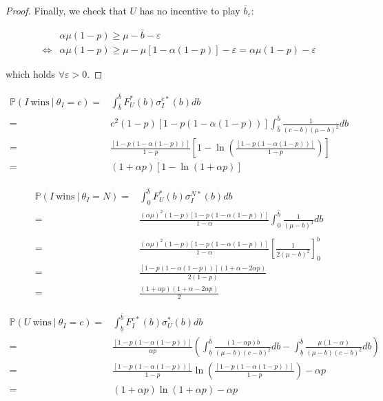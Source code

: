 \documentclass[11pt]{article}
\theoremstyle{plain}
\theoremstyle{definition}
\theoremstyle{plain}
\theoremstyle{plain}
\theoremstyle{plain}
\theoremstyle{plain}
\numberwithin{equation}{section}
\begin{document}
\begin{proof}
\vspace{4mm}

\noindent Finally, we check that $ U $ has no incentive to play $ \bar{b}_\varepsilon $:

\vspace{-4mm}

\begin{align*}
    & \alpha \mu(1-p) \geq \mu - \bar{b} - \varepsilon \\[8pt]
    \iff & \alpha \mu(1-p) \geq \mu - \mu\left[ 1-\alpha(1-p)\right] - \varepsilon = \alpha \mu(1-p) -  \varepsilon
\end{align*}

\vspace{4mm}

\noindent which holds $ \forall \varepsilon > 0 $.
\end{proof}

\begin{align*}
    \mathbb{P}(I \ \text{wins}\ | \ \theta_I = c) = & \int_{\hat{b}}^{\bar{b}} F_U^*(b) \sigma_I^{c*}(b) db \\
    = &c^2(1-p)\left[1-p\left( 1-\alpha(1-p)\right) \right] \int_{\hat{b}}^{\bar{b}} \frac{1}{(c-b)(\mu-b)^2}db \\
    = & \frac{\left[1-p\left( 1-\alpha(1-p)\right) \right]}{1-p} \left[1- \ln \left( \frac{\left[1-p\left( 1-\alpha(1-p)\right) \right]}{1-p}\right)\right] \\
    = & (1+\alpha p) \left[1- \ln (1+\alpha p)\right]
\end{align*}

\begin{align*}
    \mathbb{P}(I \ \text{wins} \ | \ \theta_I = N) = & \int_{0}^{\hat{b}} F_U^*(b) \sigma_I^{N*}(b) db \\
    = &\frac{(\alpha \mu)^2(1-p)\left[1-p\left( 1-\alpha(1-p)\right) \right]}{1-\alpha} \int_{0}^{\hat{b}} \frac{1}{(\mu-b)^3}db \\
    = &\frac{(\alpha \mu)^2(1-p)\left[1-p\left( 1-\alpha(1-p)\right) \right]}{1-\alpha} \left[\frac{1}{2(\mu-b)^2} \right]_{0}^{\hat{b}} \\
    = & \frac{\left[1-p\left( 1-\alpha(1-p)\right) \right](1+\alpha -2\alpha p)}{2(1-p)} \\
    = & \frac{(1+\alpha p)(1+\alpha -2\alpha p)}{2}
\end{align*}

\begin{align*}
    \mathbb{P}(U \ \text{wins} \ | \ \theta_I = c) = & \int_{\underline{b}}^{\bar{b}} F_I^{c*}(b) \sigma_U^*(b) db \\
    = &\frac{\left[1-p\left( 1-\alpha(1-p)\right) \right]}{\alpha p} \left( \int_{\underline{b}}^{\bar{b}} \frac{(1-\alpha p)b}{(\mu-b)(c-b)^2}db - \int_{\underline{b}}^{\bar{b}} \frac{\mu(1-\alpha)}{(\mu-b)(c-b)^2}db \right) \\
    = & \frac{\left[1-p\left( 1-\alpha(1-p)\right) \right]}{1-p} \ln \left( \frac{\left[1-p\left( 1-\alpha(1-p)\right) \right]}{1-p}\right) - \alpha p \\
    = & (1+\alpha p)\ln \left( 1+\alpha p\right) - \alpha p
\end{align*}
\end{document}
